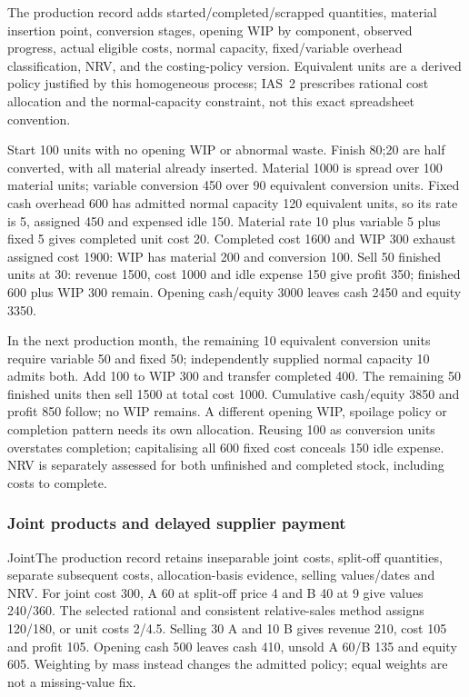 The production record adds started/completed/scrapped quantities, material insertion point, conversion stages, opening WIP by component, observed progress, actual eligible costs, normal capacity, fixed/variable overhead classification, NRV, and the costing-policy version. Equivalent units are a derived policy justified by this homogeneous process; IAS~2 \citep[IAS~2.12--18]{eu20231803} prescribes rational cost allocation and the normal-capacity constraint, not this exact spreadsheet convention.

Start 100 units with no opening WIP or abnormal waste. Finish 80;20 are half converted, with all material already inserted. Material 1000 is spread over 100 material units; variable conversion 450 over 90 equivalent conversion units. Fixed cash overhead 600 has admitted normal capacity 120 equivalent units, so its rate is 5, assigned 450 and expensed idle 150. Material rate 10 plus variable 5 plus fixed 5 gives completed unit cost 20. Completed cost 1600 and WIP 300 exhaust assigned cost 1900: WIP has material 200 and conversion 100. Sell 50 finished units at 30: revenue 1500, cost 1000 and idle expense 150 give profit 350; finished 600 plus WIP 300 remain. Opening cash/equity 3000 leaves cash 2450 and equity 3350.

In the next production month, the remaining 10 equivalent conversion units require variable 50 and fixed 50; independently supplied normal capacity 10 admits both. Add 100 to WIP 300 and transfer completed 400. The remaining 50 finished units then sell 1500 at total cost 1000. Cumulative cash/equity 3850 and profit 850 follow; no WIP remains. A different opening WIP, spoilage policy or completion pattern needs its own allocation. Reusing 100 as conversion units overstates completion; capitalising all 600 fixed cost conceals 150 idle expense. NRV is separately assessed for both unfinished and completed stock, including costs to complete.

\hypertarget{joint-products-and-delayed-supplier-payment}{%
\subsubsection{Joint products and delayed supplier payment}\label{joint-products-and-delayed-supplier-payment}}

JointThe production record retains inseparable joint costs, split-off quantities, separate subsequent costs, allocation-basis evidence, selling values/dates and NRV. For joint cost 300, A 60 at split-off price 4 and B 40 at 9 give values 240/360. The selected rational and consistent relative-sales method assigns 120/180, or unit costs 2/4.5. Selling 30 A and 10 B gives revenue 210, cost 105 and profit 105. Opening cash 500 leaves cash 410, unsold A 60/B 135 and equity 605. Weighting by mass instead changes the admitted policy; equal weights are not a missing-value fix.

